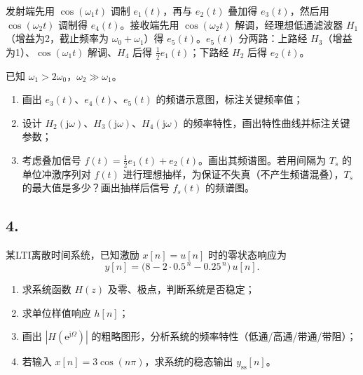 \documentclass[10pt,a4paper]{ctexart}
\begin{document}
\vspace{0.2cm}

发射端先用 $\cos(\omega_1 t)$ 调制 $e_1(t)$，再与 $e_2(t)$ 叠加得 $e_3(t)$，然后用 $\cos(\omega_2 t)$ 调制得 $e_4(t)$。接收端先用 $\cos(\omega_2 t)$ 解调，经理想低通滤波器 $H_1$（增益为2，截止频率为 $\omega_0+\omega_1$）得 $e_5(t)$。$e_5(t)$ 分两路：上路经 $H_3$（增益为1）、$\cos(\omega_1 t)$ 解调、$H_4$ 后得 $\frac12 e_1(t)$；下路经 $H_2$ 后得 $e_2(t)$。

已知 $\omega_1>2\omega_0$，$\omega_2\gg\omega_1$。

\begin{enumerate}[label=(\arabic*),leftmargin=*]
  \item 画出 $e_3(t)$、$e_4(t)$、$e_5(t)$ 的频谱示意图，标注关键频率值；
  \item 设计 $H_2(\mathrm{j}\omega)$、$H_3(\mathrm{j}\omega)$、$H_4(\mathrm{j}\omega)$ 的频率特性，画出特性曲线并标注关键参数；
  \item 考虑叠加信号 $f(t)=\frac{1}{2}e_1(t)+e_2(t)$。画出其频谱图。若用间隔为 $T_{\!s}$ 的单位冲激序列对 $f(t)$ 进行理想抽样，为保证不失真（不产生频谱混叠），$T_{\!s}$ 的最大值是多少？画出抽样后信号 $f_{\!s}(t)$ 的频谱图。
\end{enumerate}

\subsection*{4.}

某LTI离散时间系统，已知激励 $x[n]=u[n]$ 时的零状态响应为
\[
y[n]=\bigl(8-2\cdot0.5^{\,n}-0.25^{\,n}\bigr)\,u[n].
\]

\begin{enumerate}[label=(\arabic*),leftmargin=*]
  \item 求系统函数 $H(z)$ 及零、极点，判断系统是否稳定；
  \item 求单位样值响应 $h[n]$；
  \item 画出 $|H(\mathrm{e}^{\mathrm{j}\Omega})|$ 的粗略图形，分析系统的频率特性（低通/高通/带通/带阻）；
  \item 若输入 $x[n]=3\cos(n\pi)$，求系统的稳态输出 $y_{\mathrm{ss}}[n]$。
\end{enumerate}
\end{document}
